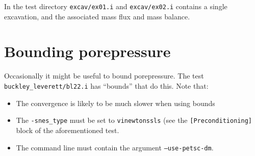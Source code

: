 \documentclass[]{scrreprt}
\begin{document}
In the test directory {\tt excav/ex01.i} and {\tt excav/ex02.i}
contains a single excavation, and the associated mass flux and mass
balance.

\section{Bounding porepressure}

Occasionally it might be useful to bound porepressure.  The test {\tt
  buckley\_leverett/bl22.i} has ``bounds'' that do this.  Note that:
\begin{itemize}
\item The convergence is likely to be much slower when using bounds
\item The {\tt -snes\_type} must be set to {\tt vinewtonssls} (see the
  {\tt [Preconditioning]} block of the aforementioned test.
\item The command line must contain the argument {\tt --use-petsc-dm}.
\end{itemize}
\end{document}
